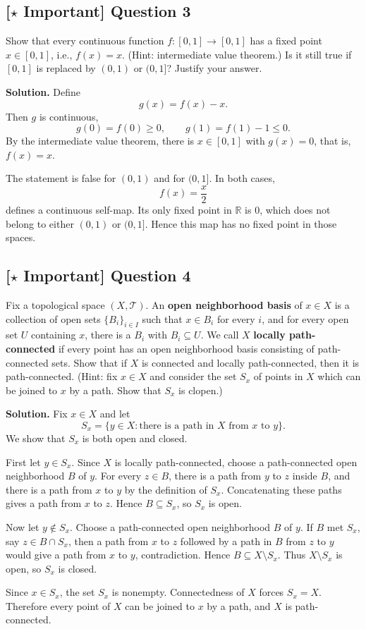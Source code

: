 \documentclass{article}
\newcommand{\R}{\mathbb{R}}
\newcommand{\important}{\texorpdfstring{\textbf{[\(\star\) Important]}}{[Important]}}
\newenvironment{solution}{\par\noindent\textbf{Solution.}\quad}{\par}
\begin{document}
\subsection{\important{} Question 3}
Show that every continuous function $f : [0,1] \to [0,1]$ has a fixed point $x \in [0,1]$, i.e., $f(x) = x$. (Hint: intermediate value theorem.) Is it still true if $[0,1]$ is replaced by $(0,1)$ or $(0,1]$? Justify your answer.

\begin{solution}
Define
\[
  g(x)=f(x)-x.
\]
Then $g$ is continuous,
\[
  g(0)=f(0)\ge0,\qquad g(1)=f(1)-1\le0.
\]
By the intermediate value theorem, there is $x\in[0,1]$ with $g(x)=0$,
that is, $f(x)=x$.

The statement is false for $(0,1)$ and for $(0,1]$. In both cases,
\[
  f(x)=\frac{x}{2}
\]
defines a continuous self-map. Its only fixed point in $\R$ is $0$, which
does not belong to either $(0,1)$ or $(0,1]$. Hence this map has no fixed
point in those spaces.
\end{solution}

\subsection{\important{} Question 4}
Fix a topological space $(X, \mathcal{T})$. An \textbf{open neighborhood basis} of $x \in X$ is a collection of open sets $\{B_i\}_{i \in I}$ such that $x \in B_i$ for every $i$, and for every open set $U$ containing $x$, there is a $B_i$ with $B_i \subseteq U$. We call $X$ \textbf{locally path-connected} if every point has an open neighborhood basis consisting of path-connected sets. Show that if $X$ is connected and locally path-connected, then it is path-connected. (Hint: fix $x \in X$ and consider the set $S_x$ of points in $X$ which can be joined to $x$ by a path. Show that $S_x$ is clopen.)

\begin{solution}
Fix $x\in X$ and let
\[
  S_x=\{y\in X:\text{there is a path in }X\text{ from }x\text{ to }y\}.
\]
We show that $S_x$ is both open and closed.

First let $y\in S_x$. Since $X$ is locally path-connected, choose a
path-connected open neighborhood $B$ of $y$. For every $z\in B$, there is
a path from $y$ to $z$ inside $B$, and there is a path from $x$ to $y$ by
the definition of $S_x$. Concatenating these paths gives a path from $x$
to $z$. Hence $B\subseteq S_x$, so $S_x$ is open.

Now let $y\notin S_x$. Choose a path-connected open neighborhood $B$ of
$y$. If $B$ met $S_x$, say $z\in B\cap S_x$, then a path from $x$ to $z$
followed by a path in $B$ from $z$ to $y$ would give a path from $x$ to
$y$, contradiction. Hence $B\subseteq X\setminus S_x$. Thus
$X\setminus S_x$ is open, so $S_x$ is closed.

Since $x\in S_x$, the set $S_x$ is nonempty. Connectedness of $X$ forces
$S_x=X$. Therefore every point of $X$ can be joined to $x$ by a path, and
$X$ is path-connected.
\end{solution}
\end{document}
